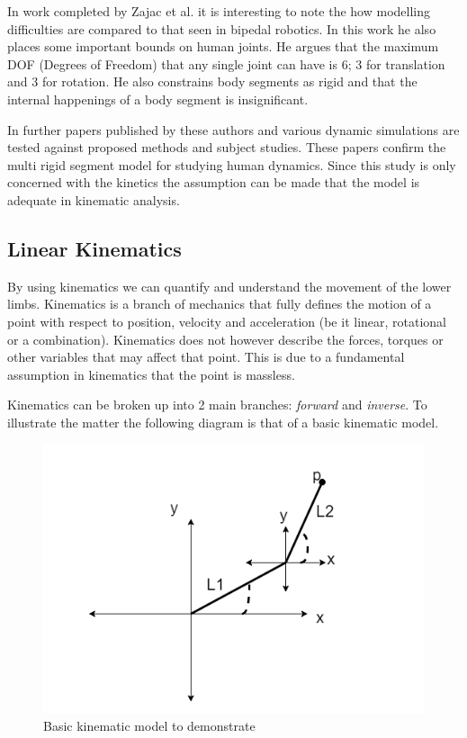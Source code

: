 In work completed by Zajac et al. \cite{zajac1990modeling} it is interesting to note the how modelling difficulties are compared to that seen in bipedal robotics. In this work he also places some important bounds on human joints. He argues that the maximum DOF (Degrees of Freedom) that any single joint can have is 6; 3 for translation and 3 for rotation. He also constrains body segments as rigid and that the internal happenings of a body segment is insignificant. 
 
In further papers published by these authors \cite{zajac2002biomechanics} and  \cite{zajac2003biomechanics} various dynamic simulations are tested against proposed methods and subject studies. These papers confirm the multi rigid segment model for studying human dynamics. Since this study is only concerned with the kinetics the assumption can be made that the model is adequate in kinematic analysis. 


\subsection{Linear Kinematics}
By using kinematics we can quantify and understand the movement of the lower limbs. Kinematics is a branch of mechanics that fully defines the motion of a point with respect to position, velocity and acceleration (be it linear, rotational or a combination). Kinematics does not however describe the forces, torques or other variables that may affect that point. This is due to a fundamental assumption in kinematics that the point is massless.	 

Kinematics can be broken up into 2 main branches: \textit{forward} and \textit{inverse}. To illustrate the matter the following diagram is that of a basic kinematic model.

\begin{figure}[!ht] 
\captionsetup{width=\linewidth, font=small}  
\includegraphics[width=\linewidth]{figures/kinematics.png}
\caption{Basic kinematic model to demonstrate}
\label{fig:kinematics}
\end{figure}

